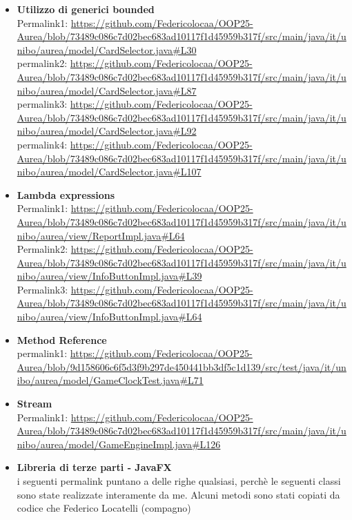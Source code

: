 \documentclass[11pt, a4paper, oneside]{report}
\begin{document}
\begin{itemize}
    \item \textbf{Utilizzo di generici bounded}\\
    Permalink1: \url{https://github.com/Federicolocaa/OOP25-Aurea/blob/73489c086c7d02bec683ad10117f1d45959b317f/src/main/java/it/unibo/aurea/model/CardSelector.java#L30} \\
    permalink2: \url{https://github.com/Federicolocaa/OOP25-Aurea/blob/73489c086c7d02bec683ad10117f1d45959b317f/src/main/java/it/unibo/aurea/model/CardSelector.java#L87} \\
    permalink3: \url{https://github.com/Federicolocaa/OOP25-Aurea/blob/73489c086c7d02bec683ad10117f1d45959b317f/src/main/java/it/unibo/aurea/model/CardSelector.java#L92} \\
    permalink4: \url{https://github.com/Federicolocaa/OOP25-Aurea/blob/73489c086c7d02bec683ad10117f1d45959b317f/src/main/java/it/unibo/aurea/model/CardSelector.java#L107}
    \item \textbf{Lambda expressions} \\
    Permalink1: \url{https://github.com/Federicolocaa/OOP25-Aurea/blob/73489c086c7d02bec683ad10117f1d45959b317f/src/main/java/it/unibo/aurea/view/ReportImpl.java#L64} \\
    Permalink2: \url{https://github.com/Federicolocaa/OOP25-Aurea/blob/73489c086c7d02bec683ad10117f1d45959b317f/src/main/java/it/unibo/aurea/view/InfoButtonImpl.java#L39} \\
    Permalink3: \url{https://github.com/Federicolocaa/OOP25-Aurea/blob/73489c086c7d02bec683ad10117f1d45959b317f/src/main/java/it/unibo/aurea/view/InfoButtonImpl.java#L64}  \\
    \item \textbf{Method Reference} \\
    permalink1: \url{https://github.com/Federicolocaa/OOP25-Aurea/blob/9d158606c6f5d3f9b297de450441bb3df5c1d139/src/test/java/it/unibo/aurea/model/GameClockTest.java#L71}
    \item \textbf{Stream} \\
    Permalink1: \url{https://github.com/Federicolocaa/OOP25-Aurea/blob/73489c086c7d02bec683ad10117f1d45959b317f/src/main/java/it/unibo/aurea/model/GameEngineImpl.java#L126} \\
    \item \textbf{Libreria di terze parti - JavaFX} \\
    i seguenti permalink puntano a delle righe qualsiasi, perchè le seguenti classi sono state realizzate interamente da me. Alcuni metodi sono stati copiati da codice che Federico Locatelli (compagno) 

\end{itemize}
\end{document}
